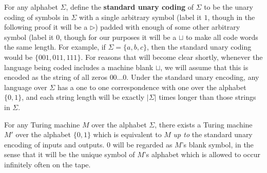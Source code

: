 For any alphabet $\Sigma$, define the \textbf{standard unary coding} of $\Sigma$ to be the unary coding of symbols in $\Sigma$ with a single arbitrary symbol (label it $1$, though in the following proof it will be a $\triangleright$) padded with enough of some other arbitrary symbol (label it $0$, though for our purposes it will be a $\sqcup$ to make all code words the same length. For example, if $\Sigma = \{a,b,c\}$, then the standard unary coding would be $\{001,011,111\}$. For reasons that will become clear shortly, whenever the language being coded includes a machine blank $\sqcup$, we will assume that this is encoded as the string of all zeros $00\ldots 0$. Under the standard unary encoding, any language over $\Sigma$ has a one to one correspondence with one over the alphabet $\{0,1\}$, and each string length will be exactly $|\Sigma|$ times longer than those strings in $\Sigma$. 
\begin{theorem}
	For any Turing machine $M$ over the alphabet $\Sigma$, there exists a Turing machine $M'$ over the alphabet $\{0,1\}$ which is equivalent to $M$ \textit{up to} the standard unary encoding of inputs and outputs. $0$ will be regarded as $M$'s blank symbol, in the sense that it will be the unique symbol of $M$'s alphabet which is allowed to occur infinitely often on the tape. 
\end{theorem}
